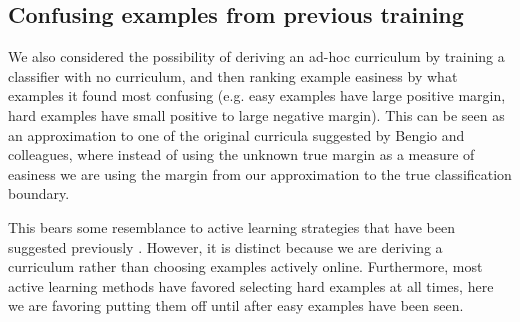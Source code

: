 \documentclass[11pt]{article}
\begin{document}
\subsection{Confusing examples from previous training}
We also considered the possibility of deriving an ad-hoc curriculum by training a classifier with no curriculum, and then ranking example easiness by what examples it found most confusing (e.g. easy examples have large positive margin, hard examples have small positive to large negative margin). This can be seen as an approximation to one of the original curricula suggested by Bengio and colleagues, where instead of using the unknown true margin as a measure of easiness we are using the margin from our approximation to the true classification boundary. \par
This bears some resemblance to active learning strategies that have been suggested previously \cite[e.g.]{Krogh1995}. However, it is distinct because we are deriving a curriculum rather than choosing examples actively online. Furthermore, most active learning methods have favored selecting hard examples at all times, here we are favoring putting them off until after easy examples have been seen. 
\end{document}
